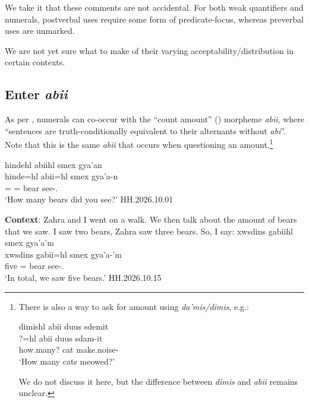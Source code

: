 \documentclass{article}
\begin{document}
We take it that these comments are not accidental. For both weak quantifiers and numerals, postverbal uses require some form of predicate-focus, whereas preverbal uses are unmarked.

We are not yet sure what to make of their varying acceptability/distribution in certain contexts.



\subsection{Enter \textit{abii}} 
As per \textcite[310]{bicevskisQuantificationGitksan2017}, numerals can co-occur with the ``count amount'' (\Cnt{})  morpheme \textit{abii}, where ``sentences are truth-conditionally equivalent to their alternants without
\textit{abi}''. Note that this is the same \textit{abii} that occurs when questioning an amount.\footnote{There is also a way to ask for amount using \textit{da'mis/dimis}, e.g.: 
\begin{exe}
    \ex \glll dimishl abii duus sdemit \\
    ?=hl abii duus sdam-it \\
    how.many? \Cnt{} cat make.noise-\Sx \\
    `How many cats meowed?' 
\end{exe}
We do not discuss it here, but the difference between \textit{dimis} and \textit{abii} remains unclear.}

\begin{exe}
    \ex \glll hindehl abiihl smex gya'an \\
    hinde=hl abii=hl smex gya'a-n \\
    \Wh{}=\Cn{} \Cnt{}=\Cn{} bear see-\Ssg{}.\Ii{} \\
    `How many bears did you see?' \hfill  HH.2026.10.01
\end{exe}

\begin{exe}
    \ex \textbf{Context}: Zahra and I went on a walk. We then talk about the amount of bears that we saw. I saw two bears, Zahra saw three bears. So, I say:
    \glll
    xwsdins gabiihl smex gya’a’m \\
    xwsdins gabii=hl smex gya’a-’m \\
    five \Cnt=\Cn{} bear see-\Fpl.\Ii \\
    \glt `In total, we saw five bears.' \hfill  HH.2026.10.15
\end{exe}
\end{document}
